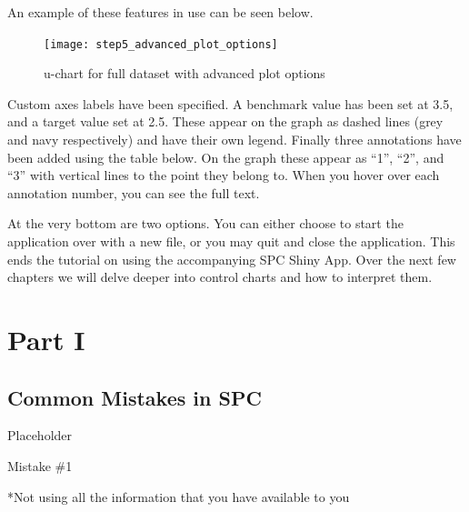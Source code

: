 \documentclass[12pt,openany]{book}
\makeatletter
\numberwithin{dummy}{section}
\theoremstyle{ocrenumbox}
\theoremstyle{ocrenumb}
\theoremstyle{blacknumex}
\theoremstyle{blacknumbox}
\theoremstyle{ocrenum}
\renewcommand{\section}{\@startsection{section}{1}{\z@}
{-4ex \@plus -1ex \@minus -.4ex}
{1ex \@plus.2ex }
{\normalfont\large\sffamily\bfseries}}
\renewcommand{\subsection}{\@startsection {subsection}{2}{\z@}
{-3ex \@plus -0.1ex \@minus -.4ex}
{0.5ex \@plus.2ex }
{\normalfont\sffamily\bfseries}}
\newlength\esp
\makeatother
\begin{document}
An example of these features in use can be seen below.

\begin{figure}

{\centering \texttt{[image: step5\_advanced\_plot\_options]} 

}

\caption{u-chart for full dataset with advanced plot options}\label{fig:unnamed-chunk-7}
\end{figure}

Custom axes labels have been specified. A benchmark value has been set at 3.5, and a target value set at 2.5. These appear on the graph as dashed lines (grey and navy respectively) and have their own legend. Finally three annotations have been added using the table below. On the graph these appear as ``1'', ``2'', and ``3'' with vertical lines to the point they belong to. When you hover over each annotation number, you can see the full text.

At the very bottom are two options. You can either choose to start the application over with a new file, or you may quit and close the application. This ends the tutorial on using the accompanying SPC Shiny App. Over the next few chapters we will delve deeper into control charts and how to interpret them.

\hypertarget{part-part-i}{%
\part{Part I}\label{part-part-i}}

\hypertarget{ch1_commonMistakes}{%
\chapter{Common Mistakes in SPC}\label{ch1_commonMistakes}}

Placeholder

\hypertarget{mistake-1}{%
\section{Mistake \#1}\label{mistake-1}}

\hypertarget{ch1_mistake1}{%
\subsection*{Not using all the information that you have available to you}\label{ch1_mistake1}}
\end{document}
